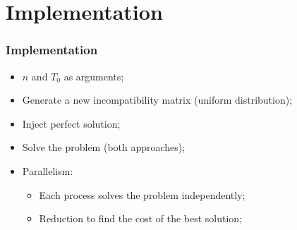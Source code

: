 \section{Implementation}
\label{sec:implementation}

\begin{frame}
	\frametitle{Implementation}
	\begin{itemize}
		\item{$n$ and $T_{0}$ as arguments;}
		\vfill
		\item{Generate a new incompatibility matrix (uniform distribution);}
		\vfill
		\item{Inject perfect solution;}
		\vfill
		\item{Solve the problem (both approaches);}
		\vfill
		\item{Parallelism:
		\begin{itemize}
			\item{Each process solves the problem independently;}
			\item{Reduction to find the cost of the best solution;}
		\end{itemize}
		}
	\end{itemize}
\end{frame}